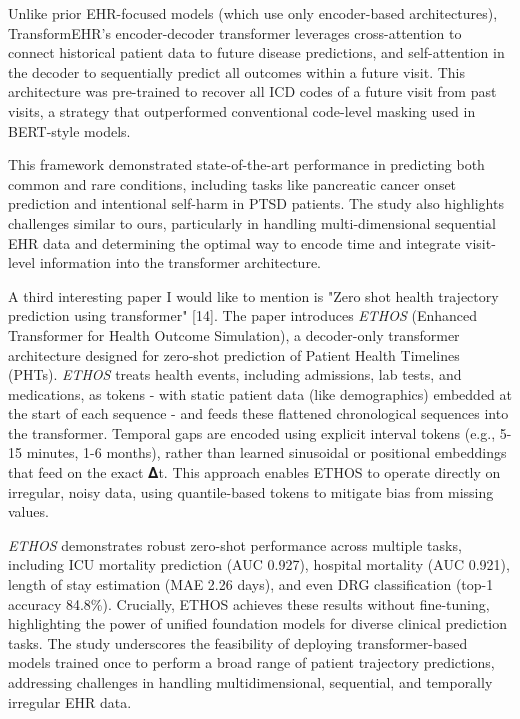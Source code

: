 \documentclass[
]{article}
\begin{document}
Unlike prior EHR-focused models (which use only encoder-based
architectures), TransformEHR's encoder-decoder transformer leverages
cross-attention to connect historical patient data to future disease
predictions, and self-attention in the decoder to sequentially predict
all outcomes within a future visit. This architecture was pre-trained to
recover all ICD codes of a future visit from past visits, a strategy
that outperformed conventional code-level masking used in BERT-style
models.

This framework demonstrated state-of-the-art performance in predicting
both common and rare conditions, including tasks like pancreatic cancer
onset prediction and intentional self-harm in PTSD patients. The study
also highlights challenges similar to ours, particularly in handling
multi-dimensional sequential EHR data and determining the optimal way to
encode time and integrate visit-level information into the transformer
architecture.

A third interesting paper I would like to mention is "Zero shot health
trajectory prediction using transformer" {[}14{]}. The paper introduces
\emph{ETHOS} (Enhanced Transformer for Health Outcome Simulation), a
decoder-only transformer architecture designed for zero-shot prediction
of Patient Health Timelines (PHTs). \emph{ETHOS} treats health events,
including admissions, lab tests, and medications, as tokens - with
static patient data (like demographics) embedded at the start of each
sequence - and feeds these flattened chronological sequences into the
transformer. Temporal gaps are encoded using explicit interval tokens
(e.g., 5-15 minutes, 1-6 months), rather than learned sinusoidal or
positional embeddings that feed on the exact 𝚫t. This approach enables
ETHOS to operate directly on irregular, noisy data, using quantile-based
tokens to mitigate bias from missing values.

\emph{ETHOS} demonstrates robust zero-shot performance across multiple
tasks, including ICU mortality prediction (AUC 0.927), hospital
mortality (AUC 0.921), length of stay estimation (MAE 2.26 days), and
even DRG classification (top-1 accuracy 84.8\%). Crucially, ETHOS
achieves these results without fine-tuning, highlighting the power of
unified foundation models for diverse clinical prediction tasks. The
study underscores the feasibility of deploying transformer-based models
trained once to perform a broad range of patient trajectory predictions,
addressing challenges in handling multidimensional, sequential, and
temporally irregular EHR data.
\end{document}
